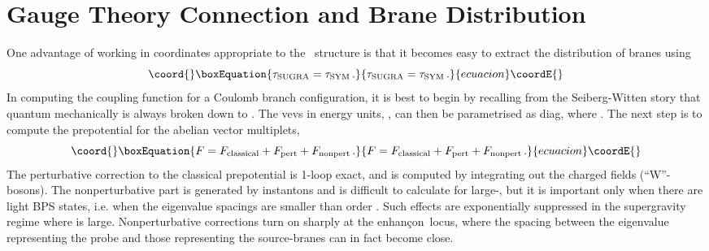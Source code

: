 \documentclass[a4paper,12pt]{amsproc}
\numberwithin{equation}{section}
\def\ls{\ell_{\rm{s}}}
\def\enh{enhan\c con}
\def\net{\myHighlight{$n{=}2$}\coordHE{}}
\begin{document}
\section{Gauge Theory Connection and Brane Distribution}

One advantage of working in coordinates appropriate to the \net\
structure is that it becomes easy to extract the distribution of
branes using
%
\begin{equation}\coord{}\boxEquation{
\tau_{\rm SUGRA}=\tau_{\rm SYM} \,.
}{
\tau_{\rm SUGRA}=\tau_{\rm SYM} \,.
}{ecuacion}\coordE{}\end{equation}
%
In computing the coupling function \coordHE{} for a Coulomb
branch configuration, it is best to begin by recalling from the
Seiberg-Witten story that quantum mechanically \coordHE{} is always
broken down to \myHighlight{$U(1)^{N-1}$}\coordHE{}.  The vevs in energy units, \myHighlight{$a\equiv
Y/(2\pi\ls^2)$}\coordHE{}, can then be parametrised as
diag\coordHE{}, where \coordHE{}.  The next step is to
compute the prepotential \myHighlight{$F$}\coordHE{} for the \myHighlight{$N-1$}\coordHE{} abelian vector multiplets,
%
\begin{equation}\coord{}\boxEquation{
F=F_{\rm classical}+ F_{\rm pert} + F_{\rm nonpert} \,.
}{
F=F_{\rm classical}+ F_{\rm pert} + F_{\rm nonpert} \,.
}{ecuacion}\coordE{}\end{equation}
%
The perturbative correction to the classical prepotential is 1-loop
exact, and is computed by integrating out the charged fields
(``W''-bosons).  The nonperturbative part is generated by instantons
and is difficult to calculate for large-\myHighlight{$N$}\coordHE{}, but it is important only
when there are light BPS states, i.e. when the eigenvalue spacings are
smaller than order \myHighlight{$1/N$}\coordHE{}.  Such effects are exponentially suppressed
in the supergravity regime where \myHighlight{$N$}\coordHE{} is large.  Nonperturbative
corrections turn on sharply at the \enh\ locus, where the spacing
between the eigenvalue representing the probe and those representing
the source-branes can in fact become close.
\end{document}
